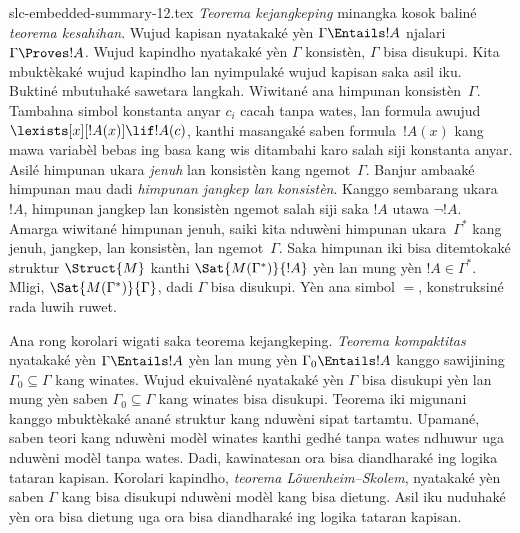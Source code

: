 \begin{filecontents*}[overwrite]{slc-embedded-summary-12.tex}
\emph{Teorema kejangkeping} minangka kosok baliné \emph{teorema
kesahihan}. Wujud kapisan nyatakaké yèn
$\Gamma\Entails !A$ njalari $\Gamma\Proves !A$. Wujud kapindho
nyatakaké yèn $\Gamma$ konsistèn, $\Gamma$ bisa disukupi.
Kita mbuktèkaké wujud kapindho lan nyimpulaké wujud kapisan
saka asil iku. Buktiné mbutuhaké sawetara langkah. Wiwitané
ana himpunan konsistèn~$\Gamma$. Tambahna simbol konstanta
anyar $c_i$ cacah tanpa wates, lan formula awujud
$\lexists[x][!A(x)]\lif !A(c)$, kanthi masangaké saben
formula~$!A(x)$ kang mawa variabèl bebas ing basa kang wis
ditambahi karo salah siji konstanta anyar. Asilé himpunan ukara
\emph{jenuh} lan konsistèn kang ngemot~$\Gamma$.
Banjur ambaaké himpunan mau dadi \emph{himpunan jangkep lan
konsistèn}. Kanggo sembarang ukara~$!A$, himpunan jangkep lan
konsistèn ngemot salah siji saka $!A$ utawa $\lnot !A$.
Amarga wiwitané himpunan jenuh, saiki kita nduwèni himpunan
ukara~$\Gamma^*$ kang jenuh, jangkep, lan konsistèn, lan
ngemot~$\Gamma$. Saka himpunan iki bisa ditemtokaké struktur
$\Struct{M}$ kanthi $\Sat{M(\Gamma^*)}{!A}$ yèn lan mung yèn
$!A\in\Gamma^*$. Mligi, $\Sat{M(\Gamma^*)}{\Gamma}$, dadi
$\Gamma$ bisa disukupi. Yèn ana simbol $=$, konstruksiné rada
luwih ruwet.

Ana rong korolari wigati saka teorema kejangkeping.
\emph{Teorema kompaktitas} nyatakaké yèn $\Gamma\Entails !A$
yèn lan mung yèn $\Gamma_0\Entails !A$ kanggo sawijining
$\Gamma_0\subseteq\Gamma$ kang winates. Wujud ekuivalèné
nyatakaké yèn $\Gamma$ bisa disukupi yèn lan mung yèn saben
$\Gamma_0\subseteq\Gamma$ kang winates bisa disukupi.
Teorema iki migunani kanggo mbuktèkaké anané struktur kang
nduwèni sipat tartamtu. Upamané, saben teori kang nduwèni
modèl winates kanthi gedhé tanpa wates ndhuwur uga nduwèni
modèl tanpa wates. Dadi, kawinatesan ora bisa diandharaké
ing logika tataran kapisan. Korolari kapindho, \emph{teorema
L\"owenheim--Skolem}, nyatakaké yèn saben $\Gamma$ kang bisa
disukupi nduwèni modèl kang bisa dietung. Asil iku nuduhaké
yèn ora bisa dietung uga ora bisa diandharaké ing logika tataran
kapisan.
\end{filecontents*}

